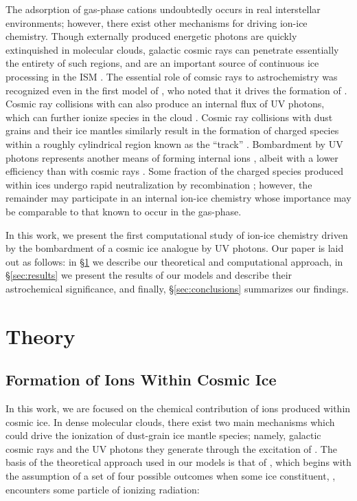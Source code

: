 \documentclass[journal=aesccq,manuscript=draft]{achemso}
\newcounter{ncounter}
\begin{document}
The adsorption of gas-phase cations undoubtedly occurs in real interstellar environments; however, there exist other mechanisms for driving ion-ice chemistry. Though externally produced energetic photons are quickly extinquished in molecular clouds, galactic cosmic rays can penetrate essentially the entirety of such regions, and are an important source of continuous ice processing in the ISM \citep{strazzulla_ion_2009,dartois_cosmic_2018}. The essential role of comsic rays to astrochemistry was recognized even in the first model of \citet{herbst_formation_1973}, who noted that it drives the formation of . Cosmic ray collisions with  can also produce an internal flux of UV photons, which can further ionize species in the cloud \citep{prasad_uv_1983,padovani_ultraviolet_2024}. Cosmic ray collisions with dust grains and their ice mantles similarly result in the formation of charged species within a roughly cylindrical region known as the ``track'' \citep{shingledecker_cosmic-ray_2020}. Bombardment by UV photons represents another means of forming internal ions \citep{mullikin_new_2021}, albeit with a lower efficiency than with cosmic rays \citep{wu_role_2024}. Some fraction of the charged species produced within ices undergo rapid neutralization by recombination \citep{shingledecker_general_2018,woon_formation_2024}; however, the remainder may participate in an internal ion-ice chemistry whose importance may be comparable to that known to occur in the gas-phase. 

In this work, we present the first computational study of ion-ice chemistry driven by the bombardment of a cosmic ice analogue by UV photons. Our paper is laid out as follows: in \S\ref{sec:theory} we describe our theoretical and computational approach, in \S\ref{sec:results} we present the results of our models and describe their astrochemical significance, and finally, \S\ref{sec:conclusions} summarizes our findings. 

\section{Theory} \label{sec:theory}

\subsection{Formation of Ions Within Cosmic Ice}\label{sec:ionformation}

In this work, we are focused on the chemical contribution of ions produced within cosmic ice. In dense molecular clouds, there exist two main mechanisms which could drive the ionization of dust-grain ice mantle species; namely, galactic cosmic rays\citep{silsbee_magnetic_2018,ivlev_penetration_2018} and the UV photons they generate through the excitation of \citep{prasad_uv_1983}. The basis of the theoretical approach used in our models is that of \citet{shingledecker_general_2018}, which begins with the assumption of a set of four possible outcomes when some ice constituent, , encounters some particle of ionizing radiation:
\end{document}
